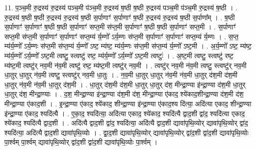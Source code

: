 \documentclass[17pt]{extarticle}
\begin{document}
11. प॒ञ्च॒मी रु॒द्रस्य॑ रु॒द्रस्य॑ पञ्च॒मी प॑ञ्च॒मी रु॒द्रस्य॑ ष॒ष्ठी ष॒ष्ठी रु॒द्रस्य॑ पञ्च॒मी प॑ञ्च॒मी रु॒द्रस्य॑ ष॒ष्ठी । . रु॒द्रस्य॑ ष॒ष्ठी ष॒ष्ठी रु॒द्रस्य॑ रु॒द्रस्य॑ ष॒ष्ठी स॒र्पाणाꣳ॑ स॒र्पाणाꣳ॑ ष॒ष्ठी रु॒द्रस्य॑ रु॒द्रस्य॑ ष॒ष्ठी स॒र्पाणा᳚म् । . ष॒ष्ठी स॒र्पाणाꣳ॑ स॒र्पाणाꣳ॑ ष॒ष्ठी ष॒ष्ठी स॒र्पाणाꣳ॑ सप्त॒मी स॑प्त॒मी स॒र्पाणाꣳ॑ ष॒ष्ठी ष॒ष्ठी स॒र्पाणाꣳ॑ सप्त॒मी । . स॒र्पाणाꣳ॑ सप्त॒मी स॑प्त॒मी स॒र्पाणाꣳ॑ स॒र्पाणाꣳ॑ सप्त॒म्य॑ र्य॒म्णो᳚ ऽर्य॒म्णः स॑प्त॒मी स॒र्पाणाꣳ॑ स॒र्पाणाꣳ॑ सप्त॒म्य॑ र्य॒म्णः । . स॒प्त॒ म्य॑र्य॒म्णो᳚ ऽर्य॒म्णः स॑प्त॒मी स॑प्त॒म्य॑ र्य॒म्णो᳚ ऽष्ट॒ म्य॑ष्ट॒ म्य॑र्य॒म्णः स॑प्त॒मी स॑प्त॒म्य॑ र्य॒म्णो᳚ ऽष्ट॒मी । . अ॒र्य॒म्णो᳚ ऽष्ट॒ म्य॑ष्ट॒ म्य॑र्य॒म्णो᳚ ऽर्य॒म्णो᳚ ऽष्ट॒मी त्वष्टु॒ स्त्वष्टु॑ रष्ट॒ म्य॑र्य॒म्णो᳚ ऽर्य॒म्णो᳚ ऽष्ट॒मी त्वष्टुः॑ । . अ॒ष्ट॒मी त्वष्टु॒ स्त्वष्टु॑ रष्ट॒ म्य॑ष्ट॒मी त्वष्टु॑र् नव॒मी न॑व॒मी त्वष्टु॑ रष्ट॒ म्य॑ष्ट॒मी त्वष्टु॑र् नव॒मी । . त्वष्टु॑र् नव॒मी न॑व॒मी त्वष्टु॒ स्त्वष्टु॑र् नव॒मी धा॒तुर् धा॒तुर् न॑व॒मी त्वष्टु॒ स्त्वष्टु॑र् नव॒मी धा॒तुः । . न॒व॒मी धा॒तुर् धा॒तुर् न॑व॒मी न॑व॒मी धा॒तुर् द॑श॒मी द॑श॒मी धा॒तुर् न॑व॒मी न॑व॒मी धा॒तुर् द॑श॒मी । . धा॒तुर् द॑श॒मी द॑श॒मी धा॒तुर् धा॒तुर् द॑श॒ मीन्द्रा॒ण्या इ॑न्द्रा॒ण्या द॑श॒मी धा॒तुर् धा॒तुर् द॑श॒ मीन्द्रा॒ण्याः । . द॒श॒ मीन्द्रा॒ण्या इ॑न्द्रा॒ण्या द॑श॒मी द॑श॒ मीन्द्रा॒ण्या ए॑काद॒ श्ये॑काद॒शीन्द्रा॒ण्या द॑श॒मी द॑श॒ मीन्द्रा॒ण्या ए॑काद॒शी । . इ॒न्द्रा॒ण्या ए॑काद॒ श्ये॑काद॒ शीन्द्रा॒ण्या इ॑न्द्रा॒ण्या ए॑काद॒श्य दि॑त्या॒ अदि॑त्या एकाद॒ शीन्द्रा॒ण्या इ॑न्द्रा॒ण्या ए॑काद॒ श्यदि॑त्यै । . ए॒का॒द॒ श्यदि॑त्या॒ अदि॑त्या एकाद॒ श्ये॑काद॒ श्यदि॑त्यै द्वाद॒शी द्वा॑द॒ श्यदि॑त्या एकाद॒ श्ये॑काद॒ श्यदि॑त्यै द्वाद॒शी । . अदि॑त्यै द्वाद॒शी द्वा॑द॒ श्यदि॑त्या॒ अदि॑त्यै द्वाद॒शी द्यावा॑पृथि॒व्योर् द्यावा॑पृथि॒व्योर् द्वा॑द॒ श्यदि॑त्या॒ अदि॑त्यै द्वाद॒शी द्यावा॑पृथि॒व्योः । . द्वा॒द॒शी द्यावा॑पृथि॒व्योर् द्यावा॑पृथि॒व्योर् द्वा॑द॒शी द्वा॑द॒शी द्यावा॑पृथि॒व्योः पा॒र्श्वम् पा॒र्श्वम् द्यावा॑पृथि॒व्योर् द्वा॑द॒शी द्वा॑द॒शी द्यावा॑पृथि॒व्योः पा॒र्श्वम् । \newline
\end{document}
